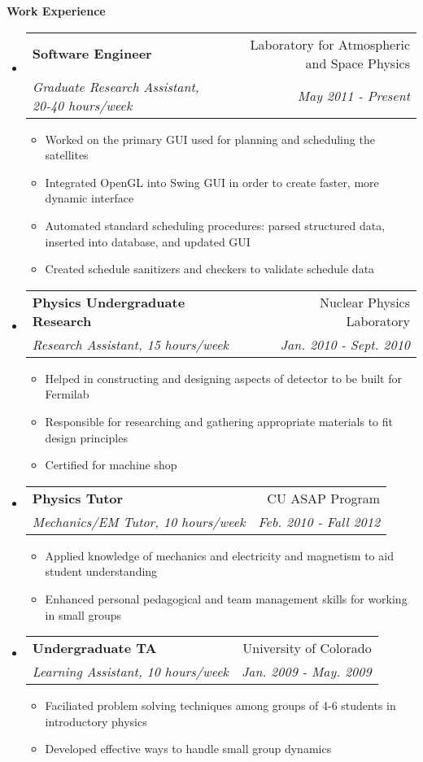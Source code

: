\documentclass[letterpaper,11pt]{article}
\makeatletter
\newcommand{\resitem}[1]{\item #1 \vspace{-2pt}}
\newcommand{\resheading}[1]{{\large
\colorbox{mygrey}{\begin{minipage}{\textwidth}{\textbf{#1
\vphantom{p\^{E}}}}\end{minipage}}}}
\newcommand{\ressubheading}[4]{
\begin{tabular*}{7.0in}{l@{\extracolsep{\fill}}r}
               \textbf{#1} & #2 \\
               \textit{#3} & \textit{#4} \\
\end{tabular*}\vspace{-6pt}}
\makeatother
\begin{document}
\resheading{Work Experience}
\begin{itemize}
\item
     \ressubheading{Software Engineer}{Laboratory for Atmospheric and Space Physics}{Graduate Research Assistant, 20-40 hours/week}{May 2011 - Present}
      \begin{itemize}
              \resitem{Worked on the primary GUI used for planning and scheduling the satellites}
              \resitem{Integrated OpenGL into Swing GUI in order to create faster, more dynamic interface}
              \resitem{Automated standard scheduling procedures: parsed structured data, inserted into database, and updated GUI}
              \resitem{Created schedule sanitizers and checkers to validate schedule data}
      \end{itemize}
\item
       \ressubheading{Physics Undergraduate Research}{Nuclear Physics Laboratory}{Research Assistant, 15 hours/week}{Jan. 2010 - Sept. 2010}
       \begin{itemize}
               \resitem{Helped in constructing and designing aspects of detector to be built for Fermilab}
               \resitem{Responsible for researching and gathering appropriate materials to fit design principles}
               \resitem{Certified for machine shop}
       \end{itemize}
\item
        \ressubheading{Physics Tutor}{CU ASAP Program}{Mechanics/EM Tutor, 10 hours/week}{Feb. 2010 - Fall 2012}
        \begin{itemize}
               \resitem{Applied knowledge of mechanics and electricity and magnetism to aid student understanding}
               \resitem{Enhanced personal pedagogical and team management skills for working in small groups}
        \end{itemize}

\item
       \ressubheading{Undergraduate TA}{University of Colorado}{Learning Assistant, 10 hours/week}{Jan. 2009 - May. 2009}
       \begin{itemize}
               \resitem{Faciliated problem solving techniques among groups of 4-6 students in introductory physics}
               \resitem{Developed effective ways to handle small group dynamics}
       \end{itemize}



\end{itemize}
\end{document}
